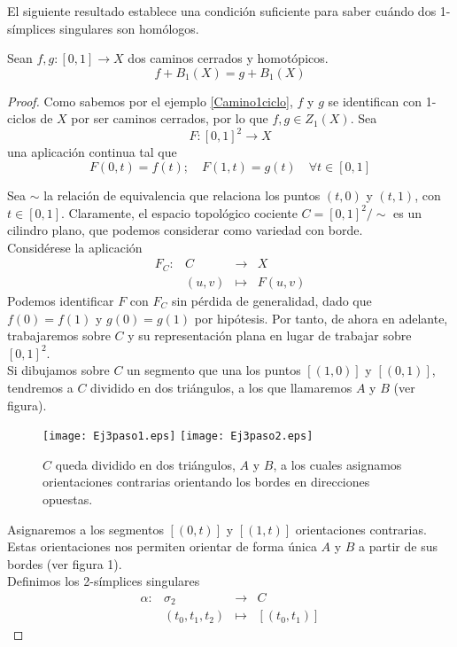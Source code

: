 El siguiente resultado establece una condición suficiente para saber cuándo dos 1-símplices singulares son homólogos.

\begin{lema}
Sean $f,g: [0,1] \longrightarrow X$ dos caminos cerrados y homotópicos. $$f+B_1(X)=g+B_1(X)$$
\end{lema}

\begin{proof}
Como sabemos por el ejemplo \ref{Camino1ciclo}, $f$ y $g$ se identifican con 1-ciclos de $X$ por ser caminos cerrados, por lo que $f,g \in Z_1(X)$. Sea $$F: [0,1]^2 \longrightarrow X$$ una aplicación continua tal que $$F(0,t)=f(t); \quad F(1,t)=g(t) \quad \forall t \in [0,1]$$

Sea $\sim$ la relación de equivalencia que relaciona los puntos $(t,0)$ y $(t,1)$, con $t \in [0,1]$. Claramente, el espacio topológico cociente $C=[0,1]^2/\sim$ es un cilindro plano, que podemos considerar como variedad con borde.
\\

Considérese la aplicación
\[\begin{array}{cccc}
F_C:&C	  &\longrightarrow&X	 \\
	&(u,v)&\longmapsto	  &F(u,v)
\end{array}\]
Podemos identificar $F$ con $F_C$ sin pérdida de generalidad, dado que $f(0)=f(1)$ y $g(0)=g(1)$ por hipótesis. Por tanto, de ahora en adelante, trabajaremos sobre $C$ y su representación plana en lugar de trabajar sobre $[0,1]^2$.
\\

Si dibujamos sobre $C$ un segmento que una los puntos $[(1,0)]$ y $[(0,1)]$, tendremos a $C$ dividido en dos triángulos, a los que llamaremos $A$ y $B$ (ver figura).

\begin{figure}[h]
\centering
\texttt{[image: Ej3paso1.eps]}
\texttt{[image: Ej3paso2.eps]}
\caption{$C$ queda dividido en dos triángulos, $A$ y $B$, a los cuales asignamos orientaciones contrarias orientando los bordes en direcciones opuestas.}
\end{figure}

Asignaremos a los segmentos $[(0,t)]$ y $[(1,t)]$ orientaciones contrarias. Estas orientaciones nos permiten orientar de forma única $A$ y $B$ a partir de sus bordes (ver figura 1).
\\

Definimos los 2-símplices singulares
\[\begin{array}{cccc}
\alpha:& \sigma_2 &\longrightarrow &C\\
            &(t_0,t_1,t_2)&\mapsto             &[(t_0,t_1)]
\end{array}\]


\end{proof}
